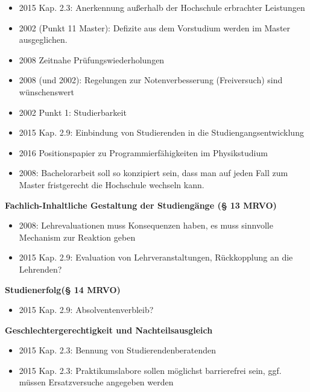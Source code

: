 \begin{itemize}
        \item 2015 Kap. 2.3: Anerkennung außerhalb der Hochschule erbrachter Leistungen
        \item 2002 (Punkt 11 Master): Defizite aus dem Vorstudium werden im Master ausgeglichen.
        \item 2008 Zeitnahe Prüfungswiederholungen
        \item 2008 (und 2002): Regelungen zur Notenverbesserung (Freiversuch) sind wünschenswert
        \item 2002 Punkt 1: Studierbarkeit
        \item 2015 Kap. 2.9: Einbindung von Studierenden in die Studiengangsentwicklung
        \item 2016 Positionspapier zu Programmierfähigkeiten im Physikstudium
        \item 2008: Bachelorarbeit soll so konzipiert sein, dass man auf jeden Fall zum Master fristgerecht die Hochschule wechseln kann.
      \end{itemize}


    \textbf{Fachlich-Inhaltliche Gestaltung der Studiengänge (§ 13 MRVO)}
      \begin{itemize}
        \item 2008: Lehrevaluationen muss Konsequenzen haben, es muss sinnvolle Mechanism zur Reaktion geben
        \item 2015 Kap. 2.9: Evaluation von Lehrveranstaltungen, Rückkopplung an die Lehrenden?
      \end{itemize}

    \textbf{Studienerfolg(§ 14 MRVO)}
      \begin{itemize}
        \item 2015 Kap. 2.9: Absolventenverbleib?
      \end{itemize}

    \textbf{Geschlechtergerechtigkeit und Nachteilsausgleich}
      \begin{itemize}
        \item 2015 Kap. 2.3: Bennung von Studierendenberatenden
        \item 2015 Kap. 2.3: Praktikumslabore sollen möglichst barrierefrei sein, ggf. müssen Ersatzversuche angegeben werden
      \end{itemize}

